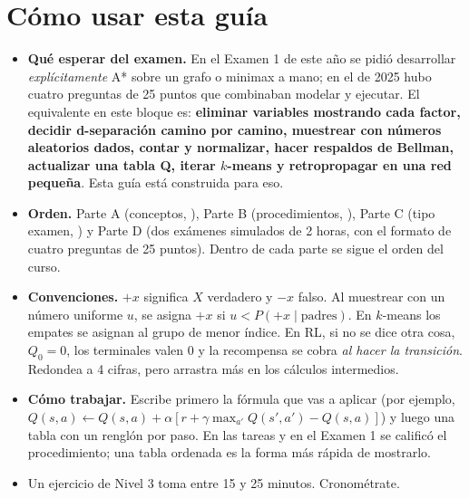 \tableofcontents
\newpage

\section*{Cómo usar esta guía}

\begin{itemize}
  \item \textbf{Qué esperar del examen.} En el Examen 1 de este año se pidió desarrollar
  \emph{explícitamente} A* sobre un grafo o minimax a mano; en el de 2025 hubo cuatro preguntas de
  25 puntos que combinaban modelar y ejecutar. El equivalente en este bloque es: \textbf{eliminar
  variables mostrando cada factor, decidir d-separación camino por camino, muestrear con números
  aleatorios dados, contar y normalizar, hacer respaldos de Bellman, actualizar una tabla Q,
  iterar $k$-means y retropropagar en una red pequeña}. Esta guía está construida para eso.
  \item \textbf{Orden.} Parte A (conceptos, ), Parte B (procedimientos, ), Parte C
  (tipo examen, ) y Parte D (dos exámenes simulados de 2 horas, con el formato de
  cuatro preguntas de 25 puntos). Dentro de cada parte se sigue el orden del curso.
  \item \textbf{Convenciones.} $+x$ significa $X$ verdadero y $-x$ falso. Al muestrear con un número
  uniforme $u$, se asigna $+x$ si $u<P(+x\mid\text{padres})$. En $k$-means los empates se asignan al
  grupo de menor índice. En RL, si no se dice otra cosa, $Q_0=0$, los terminales valen 0 y la
  recompensa se cobra \emph{al hacer la transición}. Redondea a 4 cifras, pero arrastra más en
  los cálculos intermedios.
  \item \textbf{Cómo trabajar.} Escribe primero la fórmula que vas a aplicar (por ejemplo,
  $Q(s,a)\leftarrow Q(s,a)+\alpha[r+\gamma\max_{a'}Q(s',a')-Q(s,a)]$) y luego una tabla con un renglón por
  paso. En las tareas y en el Examen 1 se calificó el procedimiento; una tabla ordenada es la
  forma más rápida de mostrarlo.
  \item Un ejercicio de Nivel 3 toma entre 15 y 25 minutos. Cronométrate.
\end{itemize}

